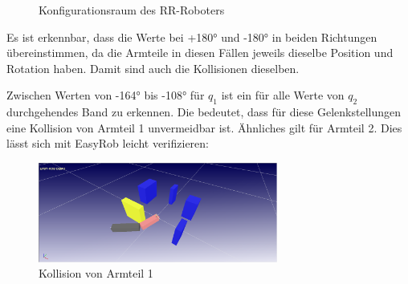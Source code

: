 \documentclass[11pt, a4paper]{article}
\begin{document}
\begin{figure}[H]
	\center{}
	\caption{Konfigurationsraum des RR-Roboters}
\end{figure}

Es ist erkennbar, dass die Werte bei +180° und -180° in beiden Richtungen übereinstimmen, da die Armteile in diesen Fällen jeweils dieselbe Position und Rotation haben. Damit sind auch die Kollisionen dieselben.

Zwischen Werten von -164° bis -108° für $q_1$ ist ein für alle Werte von $q_2$ durchgehendes Band zu erkennen. Die bedeutet, dass für diese Gelenkstellungen eine Kollision von Armteil 1 unvermeidbar ist. Ähnliches gilt für Armteil 2. Dies lässt sich mit EasyRob leicht verifizieren:

\begin{figure}[H]
	\centering\includegraphics[width=0.7\textwidth]{revolute-easyrob.png}
	\caption{Kollision von Armteil 1}
\end{figure}
\end{document}
